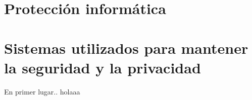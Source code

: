\chapter{Protección informática}
\label{cha:proteccion-informatica}



\chapter{Sistemas utilizados para mantener la seguridad y la privacidad}
\label{cha:tipos-sistemas}

En primer lugar.\cite{rstudio}. holaaa






\nocite{ransomware}
\nocite{sql_injection}
\nocite{vulnerabilidades}
\nocite{vulnerabilidades2}
\nocite{wikip}
\nocite{comision_europea}
\nocite{isot}
\nocite{gestion_activos}
\nocite{incibe2}
\nocite{herramientas-evaluacion-riesgos}
\nocite{bibdigital}
\nocite{bibdigital}





